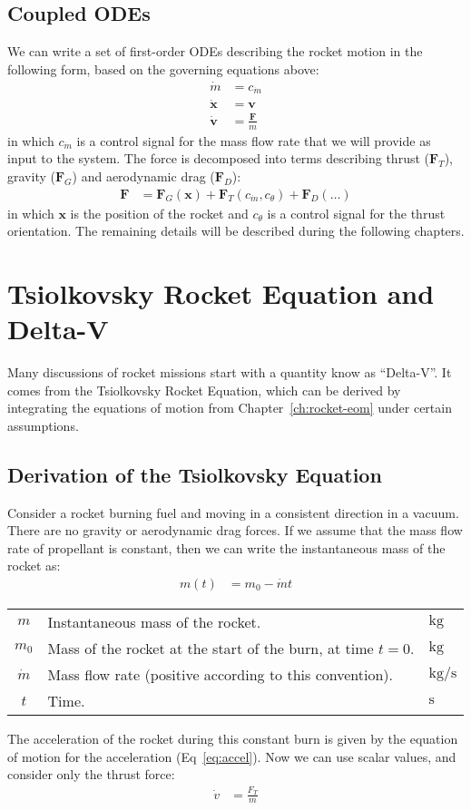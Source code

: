 \documentclass[12pt,openany]{book}
\renewcommand{\vec}[1]{\ensuremath{\mathbf{#1}}}
\newcommand{\vecdot}[1]{\ensuremath{\dot{\mathbf{#1}}}}
\newenvironment{symbols}
{%
  \begin{flushright}%
  \begin{tcolorbox}[enhanced,width=0.9\textwidth,colback=black!8!white,frame hidden]%
  \begin{tabular}{cp{0.8\textwidth}l}%
}
{%
  \end{tabular}%
  \end{tcolorbox}%
  \end{flushright}%
}
\newcommand{\unitsmass}{$\mathrm{kg}$}
\newcommand{\unitstime}{$\mathrm{s}$}
\newcommand{\unitsmassflowrate}{$\mathrm{kg}/\mathrm{s}$}
\begin{document}
\section{Coupled ODEs}

We can write a set of first-order ODEs describing the rocket motion in the following form, based on the governing equations above:
\begin{align}
  \dot{m} &= c_{\dot{m}} \\
  \vecdot{x} &= \vec{v} \\
  \vecdot{v} &= \frac{\vec{F}}{m} \label{eq:accel}
\end{align}
in which $c_{\dot{m}}$ is a control signal for the mass flow rate that we will provide as input to the system. The force is decomposed into terms describing thrust ($\vec{F}_T$), gravity ($\vec{F}_G$) and aerodynamic drag ($\vec{F}_D$):
\begin{align}
  \vec{F} &= \vec{F}_G(\vec{x})
  + \vec{F}_T(c_{\dot{m}}, c_{\theta})
  + \vec{F}_D(\ldots)
\end{align}
in which $\vec{x}$ is the position of the rocket and $c_{\theta}$ is a control signal for the thrust orientation. The remaining details will be described during the following chapters.

\chapter{Tsiolkovsky Rocket Equation and Delta-V}

Many discussions of rocket missions start with a quantity know as ``Delta-V''. It comes from the Tsiolkovsky Rocket Equation, which can be derived by integrating the equations of motion from Chapter~\ref{ch:rocket-eom} under certain assumptions.

\section{Derivation of the Tsiolkovsky Equation}

Consider a rocket burning fuel and moving in a consistent direction in a vacuum. There are no gravity or aerodynamic drag forces. If we assume that the mass flow rate of propellant is constant, then we can write the instantaneous mass of the rocket as:
\begin{align}
  m(t) &= m_0 - \dot{m} t
\end{align}
\begin{symbols}
  $m$ & Instantaneous mass of the rocket. & \unitsmass \\
  $m_0$ & Mass of the rocket at the start of the burn, at time $t=0$. & \unitsmass \\
  $\dot{m}$ & Mass flow rate (positive according to this convention). & \unitsmassflowrate \\
  $t$ & Time. & \unitstime
\end{symbols}
The acceleration of the rocket during this constant burn is given by the equation of motion for the acceleration (Eq~\ref{eq:accel}). Now we can use scalar values, and consider only the thrust force:
\begin{align}
  \dot{v} &= \frac{F_T}{m}
\end{align}



\end{document}
